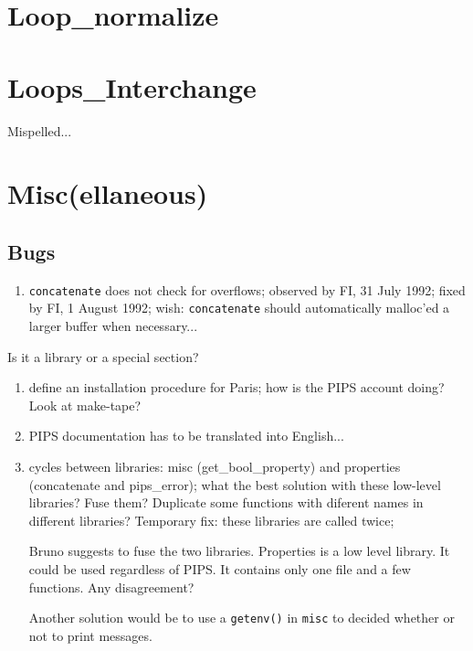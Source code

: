 \section{Loop\_normalize}

\section{Loops\_Interchange}

Mispelled...

\section{Misc(ellaneous)}

\subsection{Bugs}

\begin{enumerate}

  \item \verb+concatenate+ does not check for overflows; observed by FI,
	31 July 1992; fixed by FI, 1 August 1992; wish: \verb+concatenate+
	should automatically malloc'ed a larger buffer when necessary...

\end{enumerate}

Is it a library or a special section?

\begin{enumerate}

  \item define an installation procedure for Paris; how is the PIPS account
	doing? Look at make-tape?

  \item PIPS documentation has to be translated into English...

  \item cycles between libraries: misc (get\_bool\_property) and properties
	(concatenate and pips\_error); what the best solution with these
	low-level libraries? Fuse them? Duplicate some functions with
	diferent names in different libraries? Temporary fix: these libraries
	are called twice;

	Bruno suggests to fuse the two libraries. Properties is a low level
	library. It could be used regardless of PIPS. It contains only
	one file and a few functions. Any disagreement?

	Another solution would be to use a \verb+getenv()+ in \verb+misc+
	to decided whether or not to print messages.

\end{enumerate}

